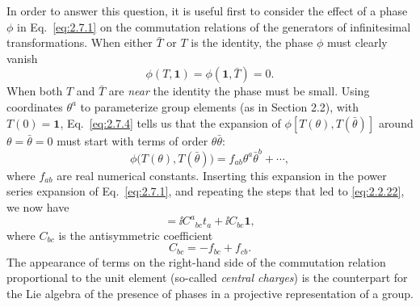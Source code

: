 In order to answer this question, it is useful first to consider the effect of
a phase $\phi$ in Eq.~\eqref{eq:2.7.1} on the commutation relations of the generators of
infinitesimal transformations. When either $\bar T$ or $T$ is the identity, the
phase $\phi$ must clearly vanish
\begin{equation}
  \phi(T,\mathbf{1})=\phi(\mathbf{1},\bar T)=0.
  \tag{2.7.4}\label{eq:2.7.4}
\end{equation}
When both $T$ and $\bar T$ are \emph{near} the identity the phase must be small.
Using coordinates $\theta^a$ to parameterize group elements (as in Section
2.2), with $T(0)=\mathbf{1}$, Eq.~\eqref{eq:2.7.4} tells us that the expansion of
$\phi[T(\theta),T(\bar\theta)]$ around $\theta=\bar\theta=0$ must start with
terms of order $\theta\bar\theta$:
\begin{equation}
  \phi\bigl(T(\theta),T(\bar\theta)\bigr)
    =f_{ab}\theta^a\bar\theta^b+\cdots,
  \tag{2.7.5}\label{eq:2.7.5}
\end{equation}
where $f_{ab}$ are real numerical constants. Inserting this expansion in the
power series expansion of Eq.~\eqref{eq:2.7.1}, and repeating the steps that led to
\eqref{eq:2.2.22}, we now have
\begin{equation}
  [t_b,t_c]=\ii C^a{}_{bc}t_a+\ii C_{bc}\mathbf{1},
  \tag{2.7.6}\label{eq:2.7.6}
\end{equation}
where $C_{bc}$ is the antisymmetric coefficient
\begin{equation}
  C_{bc}=-f_{bc}+f_{cb}.
  \tag{2.7.7}\label{eq:2.7.7}
\end{equation}
The appearance of terms on the right-hand side of the commutation relation
proportional to the unit element (so-called \emph{central charges}) is the
counterpart for the Lie algebra of the presence of phases in a projective
representation of a group.

